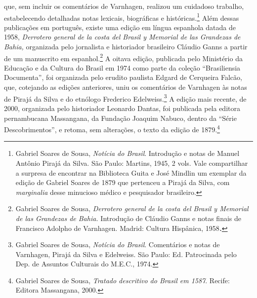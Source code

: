 que, sem incluir os comentários de Varnhagen, realizou um cuidadoso
trabalho, estabelecendo detalhadas notas lexicais, biográficas e
históricas.\footnote{ Gabriel Soares de Sousa, \textit{Notícia do
Brasil}. Introdução e notas de Manuel Antônio Pirajá da Silva. São
Paulo: Martins, 1945, 2 vols. Vale
compartilhar a surpresa de encontrar na Biblioteca Guita e José Mindlin
um exemplar da edição de Gabriel Soares de 1879 que pertenceu a Pirajá
da Silva, com \textit{marginalia} desse minucioso médico e pesquisador
brasileiro.}  Além dessas publicações em português, existe uma edição
em língua espanhola datada de 1958, \textit{Derrotero general de la
costa del Brasil y Memorial de las Grandezas de Bahia,} organizada pelo
jornalista e historiador brasileiro Cláudio Ganns a partir de um
manuscrito em espanhol.\footnote{ Gabriel Soares de
Sousa, \textit{Derrotero general de la costa del Brasil y Memorial de
las Grandezas de Bahia.} Introdução de Cláudio Ganns e notas finais de
Francisco Adolpho de Varnhagen. Madrid: Cultura Hispânica,
1958\textbf{\textit{.}}} A oitava edição, publicada pelo Ministério da
Educação e da Cultura do Brasil em 1974 como parte da coleção
“Brasiliensia Documenta”, foi organizada pelo erudito paulista Edgard
de Cerqueira Falcão, que, cotejando as edições anteriores, uniu os
comentários de Varnhagen às notas de Pirajá da Silva e do etnólogo
Frederico Edelweiss.\footnote{ Gabriel Soares de Sousa, \textit{Notícia
do Brasil}. Comentários e notas de Varnhagen, Pirajá da Silva e
Edelweiss. São Paulo: Ed. Patrocinada pelo Dep. de Assuntos Culturais
do M.E.C., 1974.} A edição mais recente, de 2000, organizada pelo
historiador Leonardo Dantas, foi publicada pela editora pernambucana
Massangana, da Fundação Joaquim Nabuco, dentro da “Série
Descobrimentos”, e retoma, sem alterações, o texto da edição de
1879.\footnote{ Gabriel Soares de Sousa, \textit{Tratado descritivo do
Brasil em 1587}. Recife: Editora Massangana, 2000.}






